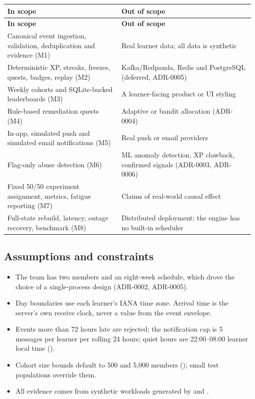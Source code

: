 \documentclass[11pt,a4paper]{article}
\newcommand{\hdr}[1]{\textbf{\color{white}\sffamily\small #1}}
\renewcommand{\_}{\textunderscore\allowbreak{}}
\begin{document}
\begin{xltabular}{\textwidth}{@{}Y Y@{}}
 \hdr{In scope} & \hdr{Out of scope} \\
\endfirsthead
{} \hdr{In scope} & \hdr{Out of scope} \\
\endhead
{} Canonical event ingestion, validation, deduplication and evidence (M1) & Real learner data; all data is synthetic \\
Deterministic XP, streaks, freezes, quests, badges, replay (M2) & Kafka/Redpanda, Redis and PostgreSQL (deferred, ADR-0005) \\
 Weekly cohorts and SQLite-backed leaderboards (M3) & A learner-facing product or UI styling \\
Rule-based remediation quests (M4) & Adaptive or bandit allocation (ADR-0004) \\
 In-app, simulated push and simulated email notifications (M5) & Real push or email providers \\
Flag-only abuse detection (M6) & ML anomaly detection, XP clawback, confirmed signals (ADR-0003, ADR-0006) \\
 Fixed 50/50 experiment assignment, metrics, fatigue reporting (M7) & Claims of real-world causal effect \\
Full-state rebuild, latency, outage recovery, benchmark (M8) & Distributed deployment; the engine has no built-in scheduler \\
\end{xltabular}

\subsection{Assumptions and constraints}

\begin{itemize}
    \item The team has two members and an eight-week schedule, which drove the choice of a single-process design (ADR-0002, ADR-0005).
    \item Day boundaries use each learner's IANA time zone. Arrival time is the server's own receive clock, never a value from the event envelope.
    \item Events more than 72 hours late are rejected; the notification cap is 5 messages per learner per rolling 24 hours; quiet hours are 22:00--08:00 learner local time ().
    \item Cohort size bounds default to 500 and 5,000 members (); small test populations override them.
    \item All evidence comes from synthetic workloads generated by  and .
\end{itemize}
\end{document}
